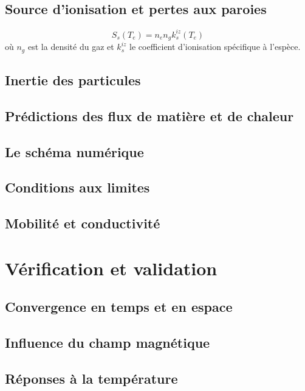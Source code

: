 \subsection{Source d'ionisation et pertes aux paroies}
\begin{equation}
	S_s(T_e)=n_en_gk_{s}^{iz}(T_e)
\end{equation}
où $n_g$ est la densité du gaz et $k_{s}^{iz}$ le coefficient d'ionisation spécifique à l'espèce. 

\subsection{Inertie des particules}
\subsection{Prédictions des flux de matière et de chaleur}
\subsection{Le schéma numérique}
\subsection{Conditions aux limites}
\subsection{Mobilité et conductivité}

\section{Vérification et validation}
\subsection{Convergence en temps et en espace}
\subsection{Influence du champ magnétique}
\subsection{Réponses à la température}


